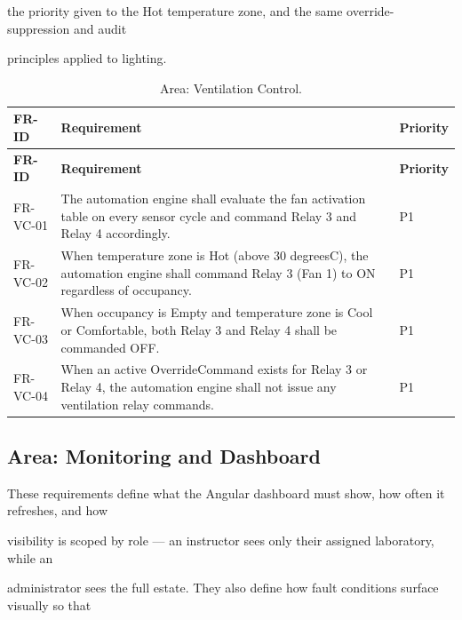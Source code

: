 the priority given to the Hot temperature zone, and the same override-suppression and audit

principles applied to lighting.

\begin{longtable}{|L{2.0cm}|L{12.0cm}|L{1.5cm}|}
	\caption{Area: Ventilation Control.} \label{tab:3-11}                                                                                                                     \\
	\hline
	\textbf{FR-ID} & \textbf{Requirement}                                                                                                                 & \textbf{Priority} \\
	\hline
	\endfirsthead
	\hline
	\textbf{FR-ID} & \textbf{Requirement}                                                                                                                 & \textbf{Priority} \\
	\hline
	\endhead
	\hline
	\endfoot
	\hline
	\endlastfoot
	FR-VC-01       & The automation engine shall evaluate the fan activation table on every sensor cycle and command Relay 3 and Relay 4 accordingly.     & P1                \\
	\hline
	FR-VC-02       & When temperature zone is Hot (above 30 degreesC), the automation engine shall command Relay 3 (Fan 1) to ON regardless of occupancy. & P1                \\
	\hline
	FR-VC-03       & When occupancy is Empty and temperature zone is Cool or Comfortable, both Relay 3 and Relay 4 shall be commanded OFF.                & P1                \\
	\hline
	FR-VC-04       & When an active OverrideCommand exists for Relay 3 or Relay 4, the automation engine shall not issue any ventilation relay commands.  & P1                \\
	\hline
\end{longtable}


\subsection{Area: Monitoring and Dashboard}
These requirements define what the Angular dashboard must show, how often it refreshes, and how

visibility is scoped by role --- an instructor sees only their assigned laboratory, while an

administrator sees the full estate. They also define how fault conditions surface visually so that

